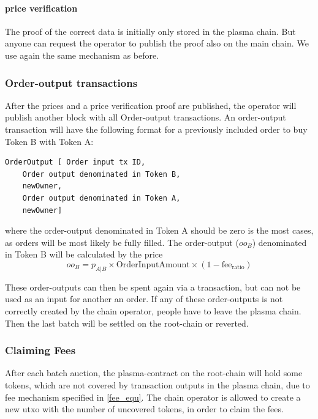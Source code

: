\documentclass[11pt,parskip=full]{scrartcl}%
\begin{document}
\paragraph{price verification}
The proof of the correct data is initially only stored in the plasma chain.
But anyone can request the operator to publish the proof also on the main chain.
We use again the same mechanism as before.


\subsubsection{Order-output transactions}
After the prices and a price verification proof are published, the operator will publish another block with all Order-output transactions.
An order-output transaction will have the following format for a previously included order to buy Token B with Token A:
\begin{lstlisting}
OrderOutput [ Order input tx ID,
    Order output denominated in Token B, 
    newOwner,
    Order output denominated in Token A,
    newOwner]

\end{lstlisting}
where the order-output denominated in Token A should be zero is the most cases, as orders will be most likely be fully filled.
The order-output ($oo_B$) denominated in Token B will be calculated by the price 
\begin{equation}
  oo_B = p_{A|B} \times \text{OrderInputAmount} \times (1-\text{fee}_{\text{ratio}})
    \label{fee_equ}
\end{equation}

These order-outputs can then be spent again via a transaction, but can not be used as an input for another an order.
If any of these order-outputs is not correctly created by the chain operator, people have to leave the plasma chain.
Then the last batch will be settled on the root-chain or reverted.

\subsubsection{Claiming Fees}
After each batch auction, the plasma-contract on the root-chain will hold some tokens, which are not covered by transaction outputs in the plasma chain, due to fee mechanism specified in \ref{fee_equ}.
The chain operator is allowed to create a new utxo with the number of uncovered tokens, in order to claim the fees.
\end{document}
